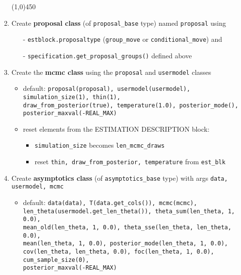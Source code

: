 \documentclass[11pt, letterpaper, notitlepage]{article}
\begin{document}
\begin{enumerate}
\begin{center}
\line(1,0){450}
\end{center}

\item Create \textbf{proposal class} (of \texttt{proposal\_base} type) named \texttt{proposal} using 
\begin{itemize}
\item[-] \texttt{estblock.proposaltype} (\texttt{group\_move} or \texttt{conditional\_move}) and
\item[-] \texttt{specification.get\_proposal\_groups()} defined above
\end{itemize}
 
 \item Create the \textbf{mcmc class} using the \texttt{proposal} and \texttt{usermodel} classes
 \begin{itemize}
 \item default: \texttt{proposal(proposal), usermodel(usermodel), simulation\_size(1), thin(1), \\
               draw\_from\_posterior(true), temperature(1.0), posterior\_mode(), \\ posterior\_maxval(-REAL\_MAX)}
 \item reset elements from the ESTIMATION DESCRIPTION block:
\begin{itemize}
\item \texttt{simulation\_size} becomes \texttt{len\_mcmc\_draws}
\item reset \texttt{thin, draw\_from\_posterior, temperature} from \texttt{est\_blk}
\end{itemize}        
\end{itemize}
\item Create \textbf{asymptotics class} (of \texttt{asymptotics\_base} type) with args \texttt{data, usermodel, mcmc}
\begin{itemize}
\item default: \texttt{data(data), T(data.get\_cols()), mcmc(mcmc), \\
len\_theta(usermodel.get\_len\_theta()), theta\_sum(len\_theta, 1, 0.0), \\ mean\_old(len\_theta, 1, 0.0), theta\_sse(len\_theta, len\_theta, 0.0),\\
              mean(len\_theta, 1, 0.0), posterior\_mode(len\_theta, 1, 0.0), \\ cov(len\_theta, len\_theta, 0.0),
              foc(len\_theta, 1, 0.0), cum\_sample\_size(0), \\ posterior\_maxval(-REAL\_MAX)}
\end{itemize}


\end{enumerate}
\end{document}
